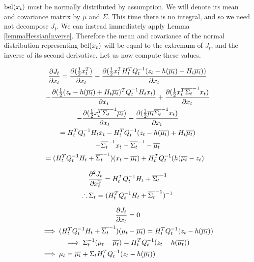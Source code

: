 \(\mathrm{bel}(x_t)\) must be normally distributed by assumption. We will denote its mean and covariance matrix by \(\mu\) and \(\Sigma\). This time there is no integral, and so we need not decompose \(J_t\). We can instead immediately apply Lemma \ref{lemmaHessianInverse}. 
Therefore the mean and covariance of the normal distribution representing \(\mathrm{bel}(x_t)\) will be equal to the extremum of \(J_t\), and the inverse of its second derivative. Let us now compute these values.

\begin{multline*}
\frac{\partial J_t}{\partial x_t} = \frac{\partial (\frac{1}{2} x_t^T )}{\partial x_t} - \frac{\partial (\frac{1}{2} x_t^T H_t^T Q_t^{-1} (z_t - h(\overline{\mu_t}) + H_t \overline{\mu_t}))}{\partial x_t} \\
- \frac{\partial (\frac{1}{2} (z_t - h(\overline{\mu_t}) + H_t \overline{\mu_t})^T Q_t^{-1} H_t x_t)}{\partial x_t} + \frac{\partial (\frac{1}{2} x_t^T \overline{\Sigma_t}^{-1} x_t)}{\partial x_t} \\
- \frac{\partial (\frac{1}{2} x_t^T \overline{\Sigma_t}^{-1} \overline{\mu_t})}{\partial x_t} - \frac{\partial (\frac{1}{2} \overline{\mu_t} \overline{\Sigma_t}^{-1} x_t )}{\partial x_t} \\
= H_t^T Q_t^{-1} H_t x_t - H_t^T Q_t^{-1} (z_t - h(\overline{\mu_t}) + H_t \overline{\mu_t}) \\
+ \overline{\Sigma_t}^{-1} x_t - \overline{\Sigma_t}^{-1} - \overline{\mu_t} \\
= (H_t^T Q_t^{-1} H_t + \overline{\Sigma_t}^{-1}) (x_t - \overline{\mu_t}) + H_t^TQ_t^{-1}(h(\overline{\mu_t} - z_t) \hfill
\end{multline*}

\begin{multline*}
\frac{\partial^2 J_t}{\partial x_t^2} = H_t^T Q_t^{-1} H_t + \overline{\Sigma_t}^{-1} \\
\therefore \Sigma_t = (H_t^T Q_t^{-1} H_t + \overline{\Sigma_t}^{-1})^{-1} \hfill
\end{multline*}

\begin{multline*}
\frac{\partial J_t}{\partial x_t} = 0 \\
\implies (H_t^T Q_t^{-1} H_t + \overline{\Sigma_t}^{-1}) (\mu_t - \overline{\mu_t}) = H_t^TQ_t^{-1}(z_t - h(\overline{\mu_t})) \\
\implies \Sigma_t^{-1} (\mu_t - \overline{\mu_t}) = H_t^TQ_t^{-1}(z_t - h(\overline{\mu_t})) \\
\implies \mu_t = \overline{\mu_t} + \Sigma_t H_t^TQ_t^{-1}(z_t - h(\overline{\mu_t})) \hfill
\end{multline*}

